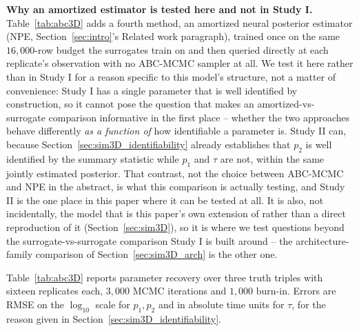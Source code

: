 \documentclass[sn-basic,iicol,pdflatex]{sn-jnl}
\begin{document}
\noindent\textbf{Why an amortized estimator is tested here and not in Study I.}
Table~\ref{tab:abc3D} adds a fourth method, an amortized neural posterior
estimator (NPE, Section~\ref{sec:intro}'s Related work paragraph), trained
once on the same $16{,}000$-row budget the surrogates train on and then
queried directly at each replicate's observation with no ABC-MCMC sampler
at all. We test it here rather than in Study I for a reason specific to
this model's structure, not a matter of convenience: Study I has a single
parameter that is well identified by construction, so it cannot pose the
question that makes an amortized-vs-surrogate comparison informative in the
first place -- whether the two approaches behave differently \emph{as a
function of} how identifiable a parameter is. Study II can, because
Section~\ref{sec:sim3D_identifiability} already establishes that $p_2$ is
well identified by the summary statistic while $p_1$ and $\tau$ are not,
within the same jointly estimated posterior. That contrast, not the choice
between ABC-MCMC and NPE in the abstract, is what this comparison is
actually testing, and Study II is the one place in this paper where it can
be tested at all. It is also, not incidentally, the model that is this
paper's own extension of \citeauthor{lu2023} rather than a direct
reproduction of it (Section~\ref{sec:sim3D}), so it is where we test
questions beyond the surrogate-vs-surrogate comparison Study I is built
around -- the architecture-family comparison of Section~\ref{sec:sim3D_arch}
is the other one.

Table~\ref{tab:abc3D} reports parameter recovery over three truth triples with
sixteen replicates each, $3{,}000$ MCMC iterations and $1{,}000$ burn-in.
Errors are RMSE on the $\log_{10}$ scale for $p_1,p_2$ and in absolute time
units for $\tau$, for the reason given in Section~\ref{sec:sim3D_identifiability}.
\end{document}
